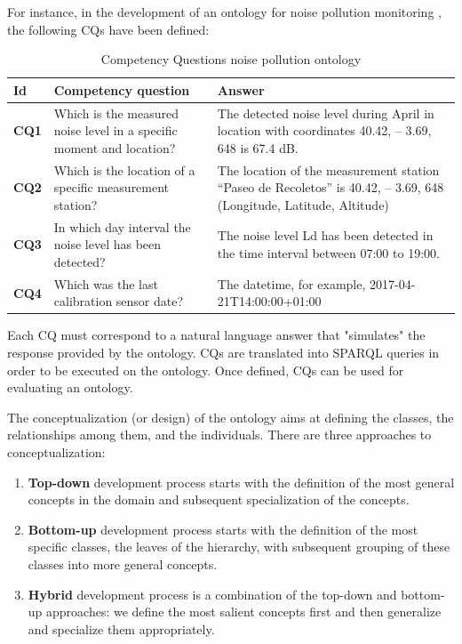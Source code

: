 For instance, in the development of an ontology for noise pollution monitoring \cite{espinoza2020using}, the following CQs have been defined:
\begin{table}[H]
    \centering
    \begin{tabular}{|>{\raggedright\arraybackslash}p{1cm}|>{\raggedright\arraybackslash}p{6cm}|>{\raggedright\arraybackslash}p{6cm}|}
        \hline
        \textbf{Id} & \textbf{Competency question} & \textbf{Answer} \\ \hline
        \textbf{CQ1} & Which is the measured noise level in a specific moment and location? & The detected noise level during April in location with coordinates 40.42, – 3.69, 648 is 67.4 dB. \\ \hline
        \textbf{CQ2} & Which is the location of a specific measurement station? & The location of the measurement station “Paseo de Recoletos” is 40.42, – 3.69, 648 (Longitude, Latitude, Altitude) \\ \hline
        \textbf{CQ3} & In which day interval the noise level has been detected? & The noise level Ld has been detected in the time interval between 07:00 to 19:00. \\ \hline
        \textbf{CQ4} & Which was the last calibration sensor date? & The datetime, for example, 2017-04-21T14:00:00+01:00 \\ \hline
    \end{tabular}
    \caption{Competency Questions noise pollution ontology}
\end{table}
Each CQ must correspond to a natural language answer that "simulates" the response provided by the ontology.
CQs are translated into SPARQL queries in order to be executed on the ontology.
Once defined, CQs can be used for evaluating an ontology.

The conceptualization (or design) of the ontology aims at defining the classes, the relationships among them, and the individuals.
There are three approaches to conceptualization:
\begin{enumerate}
    \item \textbf{Top-down} development process starts with the definition of the most general concepts in the domain and subsequent specialization of the concepts.
    \item \textbf{Bottom-up} development process starts with the definition of the most specific classes, the leaves of the hierarchy, with subsequent grouping of these classes into more general concepts.
    \item \textbf{Hybrid} development process is a combination of the top-down and bottom-up approaches: we define the most salient concepts first and then generalize and specialize them appropriately.
\end{enumerate}

